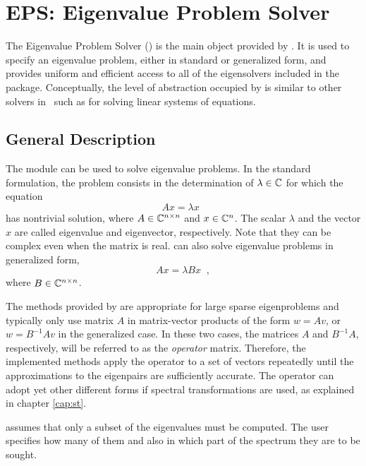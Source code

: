 \chapter{\label{cap:eps}EPS: Eigenvalue Problem Solver}

\noindent The Eigenvalue Problem Solver () is the main object provided by \slepc. It is used to specify an eigenvalue problem, either in standard or generalized form, and provides uniform and efficient access to all of the eigensolvers included in the package. Conceptually, the level of abstraction occupied by  is similar to other solvers in \petsc\ such as  for solving linear systems of equations.
	
\section{General Description}

	The  module can be used to solve eigenvalue problems. In the standard formulation, the problem consists in the determination of $\lambda\in\mathbb{C}$ for which the equation
\begin{equation}Ax=\lambda x\;\;\end{equation}
has nontrivial solution, where $A\in\mathbb{C}^{n\times n}$ and $x \in \mathbb{C}^n$. The scalar $\lambda$ and the vector $x$ are called eigenvalue and eigenvector, respectively. Note that they can be complex even when the matrix is real.
\slepc can also solve eigenvalue problems in generalized form,
\begin{equation}Ax=\lambda Bx\;\;,\end{equation}
where $B\in\mathbb{C}^{n\times n}$.

	The methods provided by \slepc are appropriate for large sparse eigenproblems and typically only use matrix $A$ in matrix-vector products of the form $w=Av$, or $w=B^{-1}\!Av$ in the generalized case. In these two cases, the matrices $A$ and $B^{-1}\!A$, respectively, will be referred to as the {\em operator\/} matrix. Therefore, the implemented methods apply the operator to a set of vectors repeatedly until the approximations to the eigenpairs are sufficiently accurate. The operator can adopt yet other different forms if spectral transformations are used, as explained in chapter \ref{cap:st}.

	\slepc assumes that only a subset of the eigenvalues must be computed. The user specifies how many of them and also in which part of the spectrum they are to be sought.
	
